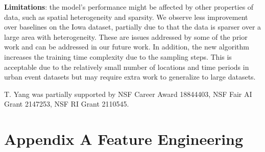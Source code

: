 \documentclass{article}
\begin{document}
{\textbf{Limitations}: the model's performance might be affected by other properties of data, such as spatial heterogeneity and sparsity. We observe less improvement over baselines on the Iowa dataset, partially due to that the data is sparser over a large area with heterogeneity. These are issues addressed by some of the prior work and can be addressed in our future work. In addition, the new algorithm increases the training time complexity due to the sampling steps. This is acceptable due to the relatively small number of locations and time periods in urban event datasets but may require extra work to generalize to large datasets.








































\begin{ack}
T. Yang was partially supported by NSF Career Award 18844403, NSF Fair AI Grant 2147253, NSF RI Grant 2110545.
\end{ack}



\medskip


\small




% 

\clearpage

\section{Appendix A Feature Engineering}

}
\end{document}
